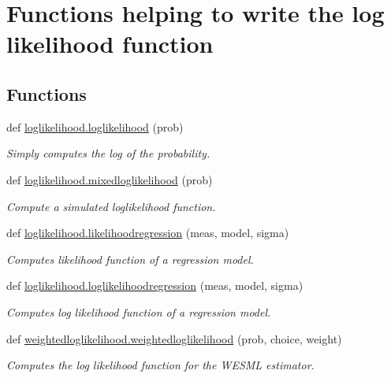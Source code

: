 \hypertarget{group__likelihood}{}\section{Functions helping to write the log likelihood function}
\label{group__likelihood}
\subsection*{Functions}
\begin{DoxyCompactItemize}
\item 
def \hyperlink{group__likelihood_ga44d204f6304b9df0f33c9118870c1b0a}{loglikelihood.\+loglikelihood} (prob)
\begin{DoxyCompactList}\small\item\em Simply computes the log of the probability. \end{DoxyCompactList}\item 
def \hyperlink{group__likelihood_ga91e0cba6602eaa8a9cd7813a2ab713b4}{loglikelihood.\+mixedloglikelihood} (prob)
\begin{DoxyCompactList}\small\item\em Compute a simulated loglikelihood function. \end{DoxyCompactList}\item 
def \hyperlink{group__likelihood_ga4f03d3819c7c23d8553a9e1aa10d86f1}{loglikelihood.\+likelihoodregression} (meas, model, sigma)
\begin{DoxyCompactList}\small\item\em Computes likelihood function of a regression model. \end{DoxyCompactList}\item 
def \hyperlink{group__likelihood_gab419ed5a3f2ef8c780f4ed099263c867}{loglikelihood.\+loglikelihoodregression} (meas, model, sigma)
\begin{DoxyCompactList}\small\item\em Computes log likelihood function of a regression model. \end{DoxyCompactList}\item 
def \hyperlink{group__likelihood_ga3f8882d4180ae23324dd8492dffb9149}{weightedloglikelihood.\+weightedloglikelihood} (prob, choice, weight)
\begin{DoxyCompactList}\small\item\em Computes the log likelihood function for the W\+E\+S\+ML estimator. \end{DoxyCompactList}\end{DoxyCompactItemize}


